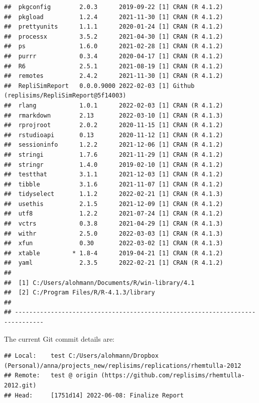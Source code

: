 \documentclass[10,a4paperpaper,]{article}
\begin{document}
\begin{verbatim}
##  pkgconfig        2.0.3      2019-09-22 [1] CRAN (R 4.1.2)
##  pkgload          1.2.4      2021-11-30 [1] CRAN (R 4.1.2)
##  prettyunits      1.1.1      2020-01-24 [1] CRAN (R 4.1.2)
##  processx         3.5.2      2021-04-30 [1] CRAN (R 4.1.2)
##  ps               1.6.0      2021-02-28 [1] CRAN (R 4.1.2)
##  purrr            0.3.4      2020-04-17 [1] CRAN (R 4.1.2)
##  R6               2.5.1      2021-08-19 [1] CRAN (R 4.1.2)
##  remotes          2.4.2      2021-11-30 [1] CRAN (R 4.1.2)
##  RepliSimReport   0.0.0.9000 2022-02-03 [1] Github (replisims/RepliSimReport@5f14003)
##  rlang            1.0.1      2022-02-03 [1] CRAN (R 4.1.2)
##  rmarkdown        2.13       2022-03-10 [1] CRAN (R 4.1.3)
##  rprojroot        2.0.2      2020-11-15 [1] CRAN (R 4.1.2)
##  rstudioapi       0.13       2020-11-12 [1] CRAN (R 4.1.2)
##  sessioninfo      1.2.2      2021-12-06 [1] CRAN (R 4.1.2)
##  stringi          1.7.6      2021-11-29 [1] CRAN (R 4.1.2)
##  stringr          1.4.0      2019-02-10 [1] CRAN (R 4.1.2)
##  testthat         3.1.1      2021-12-03 [1] CRAN (R 4.1.2)
##  tibble           3.1.6      2021-11-07 [1] CRAN (R 4.1.2)
##  tidyselect       1.1.2      2022-02-21 [1] CRAN (R 4.1.3)
##  usethis          2.1.5      2021-12-09 [1] CRAN (R 4.1.2)
##  utf8             1.2.2      2021-07-24 [1] CRAN (R 4.1.2)
##  vctrs            0.3.8      2021-04-29 [1] CRAN (R 4.1.3)
##  withr            2.5.0      2022-03-03 [1] CRAN (R 4.1.3)
##  xfun             0.30       2022-03-02 [1] CRAN (R 4.1.3)
##  xtable         * 1.8-4      2019-04-21 [1] CRAN (R 4.1.2)
##  yaml             2.3.5      2022-02-21 [1] CRAN (R 4.1.2)
## 
##  [1] C:/Users/alohmann/Documents/R/win-library/4.1
##  [2] C:/Program Files/R/R-4.1.3/library
## 
## ------------------------------------------------------------------------------
\end{verbatim}

The current Git commit details are:

\begin{verbatim}
## Local:    test C:/Users/alohmann/Dropbox (Personal)/anna/projects_new/replisims/replications/rhemtulla-2012
## Remote:   test @ origin (https://github.com/replisims/rhemtulla-2012.git)
## Head:     [1751d14] 2022-06-08: Finalize Report
\end{verbatim}
\end{document}
